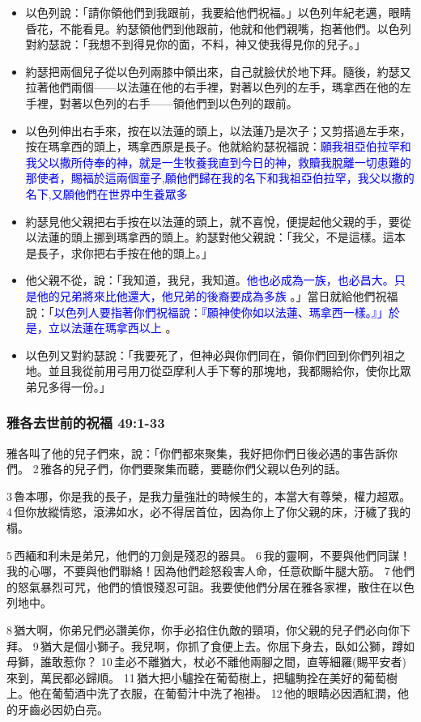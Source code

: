 \begin{itemize} 
\itemsep-.35em 
\item 以色列說：「請你領他們到我跟前，我要給他們祝福。」以色列年紀老邁，眼睛昏花，不能看見。約瑟領他們到他跟前，他就和他們親嘴，抱著他們。以色列對約瑟說：「我想不到得見你的面，不料，神又使我得見你的兒子。」 
\item 約瑟把兩個兒子從以色列兩膝中領出來，自己就臉伏於地下拜。隨後，約瑟又拉著他們兩個——以法蓮在他的右手裡，對著以色列的左手，瑪拿西在他的左手裡，對著以色列的右手——領他們到以色列的跟前。 
\item 以色列伸出右手來，按在以法蓮的頭上，以法蓮乃是次子；又剪搭過左手來，按在瑪拿西的頭上，瑪拿西原是長子。他就給約瑟祝福說：\textcolor{blue}{願我祖亞伯拉罕和我父以撒所侍奉的神，就是一生牧養我直到今日的神，救贖我脫離一切患難的那使者，賜福於這兩個童子,願他們歸在我的名下和我祖亞伯拉罕，我父以撒的名下,又願他們在世界中生養眾多} 
\item 約瑟見他父親把右手按在以法蓮的頭上，就不喜悅，便提起他父親的手，要從以法蓮的頭上挪到瑪拿西的頭上。約瑟對他父親說：「我父，不是這樣。這本是長子，求你把右手按在他的頭上。」 
\item 他父親不從，說：「我知道，我兒，我知道。\textcolor{blue}{他也必成為一族，也必昌大。只是他的兄弟將來比他還大，他兄弟的後裔要成為多族} 。」當日就給他們祝福說：「\textcolor{blue}{以色列人要指著你們祝福說：『願神使你如以法蓮、瑪拿西一樣。』」於是，立以法蓮在瑪拿西以上} 。
\item 以色列又對約瑟說：「我要死了，但神必與你們同在，領你們回到你們列祖之地。並且我從前用弓用刀從亞摩利人手下奪的那塊地，我都賜給你，使你比眾弟兄多得一份。」
\end{itemize}

\subsubsection{雅各去世前的祝福 49:1-33 }
雅各叫了他的兒子們來，說：「你們都來聚集，我好把你們日後必遇的事告訴你們。 2 雅各的兒子們，你們要聚集而聽，要聽你們父親以色列的話。

3 魯本哪，你是我的長子，是我力量強壯的時候生的，本當大有尊榮，權力超眾。 4 但你放縱情慾，滾沸如水，必不得居首位，因為你上了你父親的床，汙穢了我的榻。

5 西緬和利未是弟兄，他們的刀劍是殘忍的器具。 6 我的靈啊，不要與他們同謀！我的心哪，不要與他們聯絡！因為他們趁怒殺害人命，任意砍斷牛腿大筋。 7 他們的怒氣暴烈可咒，他們的憤恨殘忍可詛。我要使他們分居在雅各家裡，散住在以色列地中。

8 猶大啊，你弟兄們必讚美你，你手必掐住仇敵的頸項，你父親的兒子們必向你下拜。 9 猶大是個小獅子。我兒啊，你抓了食便上去。你屈下身去，臥如公獅，蹲如母獅，誰敢惹你？ 10 圭必不離猶大，杖必不離他兩腳之間，直等細羅(賜平安者)來到，萬民都必歸順。 11 猶大把小驢拴在葡萄樹上，把驢駒拴在美好的葡萄樹上。他在葡萄酒中洗了衣服，在葡萄汁中洗了袍褂。 12 他的眼睛必因酒紅潤，他的牙齒必因奶白亮。

